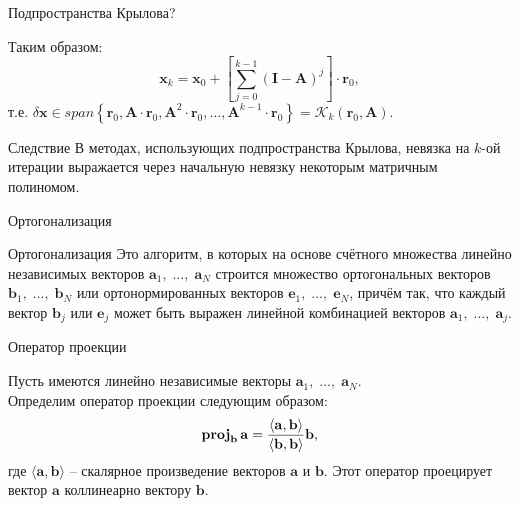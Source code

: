 \documentclass[10pt,xcolor=pst,aspectratio=169]{beamer}
\begin{document}
\begin{frame}{Подпространства Крылова?}

	\transdissolve[duration=0.2]
	\justifying
	\large
	Таким образом:
	\[
		\textbf{x}_{k} = \textbf{x}_{0} + \left[ \sum_{j = 0}^{k - 1} (\textbf{I} - \textbf{A})^{j} \right] \cdot \textbf{r}_{0} ,
	\]
	т.е. $\delta\textbf{x} \in span \left\lbrace \textbf{r}_{0} , \textbf{A} \cdot \textbf{r}_{0} , \textbf{A}^{2} \cdot \textbf{r}_{0} , \ldots , \textbf{A}^{k - 1} \cdot \textbf{r}_{0} \right\rbrace = \mathcal{K}_{k}(\textbf{r}_{0} , \textbf{A}) .$
	\pause
	\begin{block}{Следствие}
		\justifying
		В методах, использующих подпространства Крылова, невязка на $k$-ой итерации выражается через начальную невязку некоторым матричным полиномом.
	\end{block}

\end{frame}

\begin{frame}{Ортогонализация}

	\transdissolve[duration=0.2]
	\justifying
	\large
	\begin{block}{Ортогонализация}
		\justifying
		Это алгоритм, в которых на основе счётного множества линейно независимых векторов $\mathbf{a}_1,\;\ldots,\;\mathbf{a}_N$ строится множество ортогональных векторов $\mathbf{b}_1,\;\ldots,\;\mathbf{b}_N$ или ортонормированных векторов $\mathbf{e}_1,\;\ldots,\;\mathbf{e}_N$, причём так, что каждый вектор $\mathbf{b}_j$ или $\mathbf{e}_j$ может быть выражен линейной комбинацией векторов $\mathbf{a}_1,\;\ldots,\;\mathbf{a}_j$.
	\end{block}

\end{frame}

\begin{frame}{Оператор проекции}

	\transdissolve[duration=0.2]
	\justifying
	\large
	Пусть имеются линейно независимые векторы $\mathbf{a}_1,\;\ldots,\;\mathbf{a}_N$.\\
	Определим оператор проекции следующим образом:\\
    \[
		\mathbf{proj}_{\mathbf{b}}\,\mathbf{a} = {\langle \mathbf{a}, \mathbf{b} \rangle \over \langle \mathbf{b}, \mathbf{b}\rangle} \mathbf{b} ,
	\]
	где $\langle \mathbf{a}, \mathbf{b} \rangle$ -- скалярное произведение векторов $\mathbf{a}$ и $\mathbf{b}$. Этот оператор проецирует вектор $\mathbf{a}$ коллинеарно вектору $\mathbf{b}$.

\end{frame}
\end{document}
